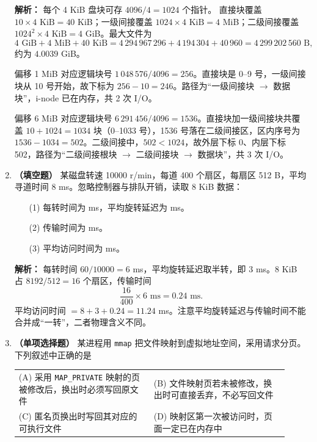 \begin{enumerate}
\ifshowsolutions\par\noindent\textbf{解析：} 每个 4 KiB 盘块可存 $4096/4=1024$ 个指针。
直接块覆盖 $10\times4\text{ KiB}=40$ KiB；一级间接覆盖 $1024\times4\text{ KiB}=4$ MiB；二级间接覆盖 $1024^2\times4\text{ KiB}=4$ GiB。最大文件为
\[
4\text{ GiB}+4\text{ MiB}+40\text{ KiB}=4\,294\,967\,296+4\,194\,304+40\,960=4\,299\,202\,560\text{ B},
\]
约为 $4.0039$ GiB。

偏移 1 MiB 对应逻辑块号 $1\,048\,576/4096=256$。直接块是 0--9 号，一级间接块从 10 号开始，故下标为 $256-10=246$。路径为“一级间接块 $\to$ 数据块”，i-node 已在内存，共 2 次 I/O。

偏移 6 MiB 对应逻辑块号 $6\,291\,456/4096=1536$。直接块加一级间接块共覆盖 $10+1024=1034$ 块（0--1033 号），1536 号落在二级间接区，区内序号为 $1536-1034=502$。二级间接中，$502<1024$，故外层下标 0、内层下标 502，路径为“二级间接根块 $\to$ 二级间接块 $\to$ 数据块”，共 3 次 I/O。\par\noindent{}\else \answerarea[6] \fi

\item \textbf{（填空题）} 某磁盘转速 10000 r/min，每道 400 个扇区，每扇区 512 B，平均寻道时间 8 ms。忽略控制器与排队开销，读取 8 KiB 数据：
\begin{enumerate}
\item[(1)] 每转时间为 \underline{\qquad} ms，平均旋转延迟为 \underline{\qquad} ms。
\item[(2)] 传输时间为 \underline{\qquad} ms。
\item[(3)] 平均访问时间为 \underline{\qquad} ms。
\end{enumerate}

\ifshowsolutions\par\noindent\textbf{解析：} 每转时间 $60/10000=6$ ms，平均旋转延迟取半转，即 3 ms。8 KiB 占 $8192/512=16$ 个扇区，传输时间
\[
\frac{16}{400}\times 6\text{ ms}=0.24\text{ ms}.
\]
平均访问时间 $=8+3+0.24=11.24$ ms。注意平均旋转延迟与传输时间不能合并成“一转”，二者物理含义不同。\par\noindent{}\else \answerarea[5] \fi

\item \textbf{（单项选择题）} 某进程用 \texttt{mmap} 把文件映射到虚拟地址空间，采用请求分页。下列叙述中正确的是
\begin{center}
\begin{tabular}{p{0.46\linewidth}p{0.46\linewidth}}
(A) 采用 \texttt{MAP\_PRIVATE} 映射的页被修改后，换出时必须写回原文件 & (B) 文件映射页若未被修改，换出时可直接丢弃，不必写回文件 \\[4pt]
(C) 匿名页换出时写回其对应的可执行文件 & (D) 映射区第一次被访问时，页面一定已在内存中
\end{tabular}
\end{center}


\end{enumerate}
